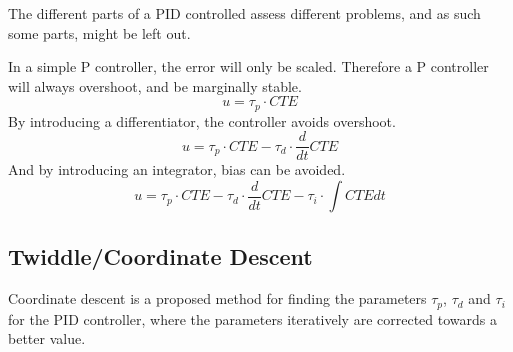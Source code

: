 \documentclass[Main]{subfiles}
\begin{document}
The different parts of a PID controlled assess different problems, and as such some parts, might be left out.

In a simple P controller, the error will only be scaled. 
Therefore a P controller will always overshoot, and be marginally stable.
\begin{equation}
	u = \tau_p \cdot CTE
\end{equation}
By introducing a differentiator, the controller avoids overshoot.
\begin{equation}
	u = \tau_p \cdot CTE - \tau_d \cdot \frac{d}{dt} CTE
\end{equation}
And by introducing an integrator, bias can be avoided.
\begin{equation}
	u = \tau_p \cdot CTE - \tau_d \cdot \frac{d}{dt} CTE - \tau_i \cdot \int CTE dt
\end{equation}

\subsection{Twiddle/Coordinate Descent}

Coordinate descent is a proposed method for finding the parameters $\tau_p$, $\tau_d$ and $\tau_i$ for the PID controller, where the parameters iteratively are corrected towards a better value.
\end{document}
